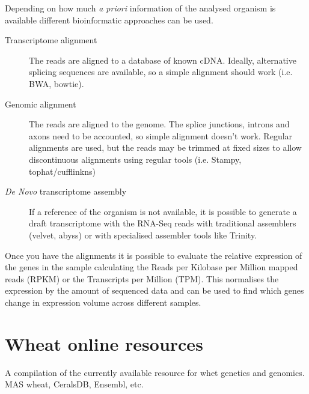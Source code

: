 Depending on how much \textit{a priori} information of the analysed organism is available different bioinformatic approaches can be used.
\begin{description}
\item[Transcriptome alignment] The reads are aligned to a database of known cDNA. Ideally, alternative splicing sequences are available, so a simple alignment should work (i.e. BWA, bowtie). 
\item[Genomic alignment] The reads are aligned to the genome. The splice junctions, introns and axons need to be accounted, so simple alignment doesn't work. Regular alignments are used, but the reads may be trimmed at fixed sizes to allow discontinuous alignments using regular tools (i.e. Stampy, tophat/cufflinkns)
\item[\textit{De Novo} transcriptome assembly] If a reference of the organism is not available, it is possible to generate a draft transcriptome with the RNA-Seq reads with traditional assemblers (velvet, abyss) or with specialised assembler tools like Trinity. 
\end{description}

Once you have the alignments it is possible to evaluate the relative expression of the genes in the sample calculating the Reads per Kilobase per Million mapped reads (RPKM) or the Transcripts per Million (TPM). This normalises the expression by the amount of sequenced data and can be used to find which genes change in expression volume across different samples.   



%









\section{Wheat online resources}
A compilation of the currently available resource for whet genetics and genomics. MAS wheat, CeralsDB, Ensembl, etc.  